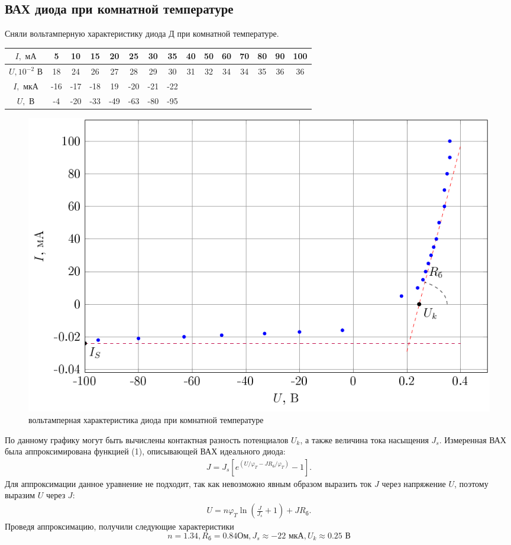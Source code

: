 \subsection{ВАХ диода при комнатной температуре}
Сняли вольтамперную характеристику диода Д при комнатной температуре.

		
\begin{table}[htbp]
	\centering
	\begin{tabular}{|c|c|c|c|c|c|c|c|c|c|c|c|c|c|c|}
		\toprule
		$I, \text{ мА}$ & 5     & 10    & 15    & 20    & 25    & 30    & 35    & 40    & 50    & 60    & 70    & 80    & 90    & 100 \\
		\midrule
		$U, 10^{-2} \text{ В}$ & 18    & 24    & 26    & 27    & 28    & 29    & 30    & 31    & 32    & 34    & 34    & 35    & 36    & 36 \\
		\midrule
		$I, \text{ мкА}$ & -16   & -17   & -18   & 19    & -20   & -21   & -22   &       &       &       &       &       &       &  \\
		\midrule
		$U, \text{ В}$  & -4    & -20   & -33   & -49   & -63   & -80   & -95   &       &       &       &       &       &       &  \\
		\bottomrule
	\end{tabular}%
\end{table}%


\begin{figure}[H]
	\centering
	\includegraphics[width=\linewidth]{plots/plots1}
	\caption{вольтамперная характеристика диода при комнатной температуре}
	\label{fig:7}
\end{figure}
По данному графику могут быть вычислены контактная разность потенциалов $U_k$, а также величина тока насыщения $J_s$.
Измеренная ВАХ была аппроксимирована функцией (1), описывающей ВАХ идеального диода:
\begin{gather}
J=J_s[e^{(U/\varphi_T-JR_{\text{б}}/\varphi_T)}-1].
\end{gather}
Для аппроксимации данное уравнение не подходит, так как невозможно явным образом
выразить ток $J$ через напряжение $U$, поэтому выразим $U$ через $J$:
\begin{gather}
U=n\varphi_T\ln(\frac{J}{J_s}+1)+JR_{\text{б}}.
\end{gather}
Проведя аппроксимацию, получили следующие характеристики
$$n = 1.34, R_\text{б} = 0.84 \text{Ом}, J_s \approx -22 \text{ мкА}, U_k \approx 0.25 \text{ В}$$
\newpage
